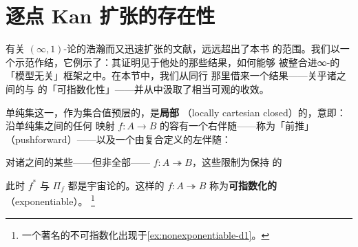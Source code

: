 
\providecommand{\Fun}{\operatorname{Fun}}
\providecommand{\QCat}{\mathcal{Q}\mathcal{C}at}
\providecommand{\sSet}{s\mathcal{S}et}
\providecommand{\Cart}{\mathcal{C}art}
\providecommand{\coCart}{\mathit{coCart}}
\providecommand{\HomA}{\mathrm{Hom}_{A}}
\providecommand{\HomB}{\mathrm{Hom}_{B}}
\providecommand{\HomC}{\mathrm{Hom}_{C}}
\providecommand{\HomE}{\mathrm{Hom}_{E}}
\providecommand{\HomOne}{\mathrm{Hom}_{1}}

\section{逐点 Kan 扩张的存在性}\label{sec:existence-of-pointwise-kan-extensions}

有关 $(\infty,1)$-\trCategory{}论的浩瀚而又迅速扩张的文献，远远超出了本书
的范围。我们以一个示范作结，它例示了：其证明见于他处的那些结果，如何能够
被整合进∞-\trInfinityCosmos{}的「模型无关」框架之中。在本节中，我们从同行
那里借来一个结果——关乎诸\trQuasiCategory{}之间的\trCartesianFibration{}与%
\trCocartesianFibration{}的「可指数化性」——并从中汲取了相当可观的收效。

单纯集这一\trCategory，作为集合值预层的\trCategory，是\textbf{局部%
\trCartesianClosed}（locally cartesian closed）的，意即：沿单纯集之间的任何
映射 $f\colon A\to B$ 的\trPullback{}容有一个右伴随——称为「前推」
（pushforward）——以及一个由复合定义的左伴随：
\begin{rveq}\label{eq:sset-slice-adjunction}
\end{rveq}

对诸\trQuasiCategory{}之间的某些——但非全部——\trIsofibration{}
$f\colon A\twoheadrightarrow B$，这些\trAdjunction{}限制为保持%
\trIsofibration{}的\trFunctor
\begin{center}
\end{center}
此时 $f^{*}$ 与 $\Pi_{f}$ 都是宇宙论的。这样的\trIsofibration{}
$f\colon A\twoheadrightarrow B$ 称为\textbf{可指数化的}（exponentiable）。%
\footnote{一个著名的不可指数化\trFunctor{}出现于\cref{ex:nonexponentiable-d1}。}

